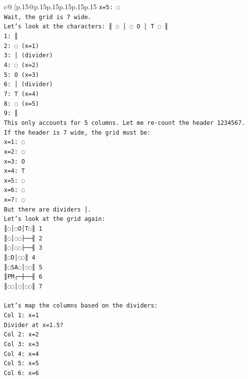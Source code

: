 \documentclass{article}
\begin{document}
{\begin{supertabular}{c@{$\;$}|p{.15\linewidth}@{}p{.15\linewidth}p{.15\linewidth}p{.15\linewidth}p{.15\linewidth}p{.15\linewidth}}
{{{\texttt{x=5: ◌} \\
\texttt{Wait, the grid is 7 wide.} \\
\texttt{Let's look at the characters: ║ ◌ │ ◌ O │ T ◌ ║} \\
\texttt{1: ║} \\
\texttt{2: ◌ (x=1)} \\
\texttt{3: │ (divider)} \\
\texttt{4: ◌ (x=2)} \\
\texttt{5: O (x=3)} \\
\texttt{6: │ (divider)} \\
\texttt{7: T (x=4)} \\
\texttt{8: ◌ (x=5)} \\
\texttt{9: ║} \\
\texttt{This only accounts for 5 columns. Let me re{-}count the header 1234567.} \\
\texttt{If the header is 7 wide, the grid must be:} \\
\texttt{x=1: ◌} \\
\texttt{x=2: ◌} \\
\texttt{x=3: O} \\
\texttt{x=4: T} \\
\texttt{x=5: ◌} \\
\texttt{x=6: ◌} \\
\texttt{x=7: ◌} \\
\texttt{But there are dividers │.} \\
\texttt{Let's look at the grid again:} \\
\texttt{║◌│◌O│T◌║ 1} \\
\texttt{║◌│◌◌├──╢ 2} \\
\texttt{║◌│◌◌├──╢ 3} \\
\texttt{║◌D│◌◌║ 4} \\
\texttt{║◌SA◌│◌◌║ 5} \\
\texttt{║PM┌─┼──╢ 6} \\
\texttt{║◌◌│◌│◌◌║ 7} \\
\\ 
\texttt{Let's map the columns based on the dividers:} \\
\texttt{Col 1: x=1} \\
\texttt{Divider at x=1.5?} \\
\texttt{Col 2: x=2} \\
\texttt{Col 3: x=3} \\
\texttt{Col 4: x=4} \\
\texttt{Col 5: x=5} \\
\texttt{Col 6: x=6} \\
}}}
\end{supertabular}}
\end{document}
